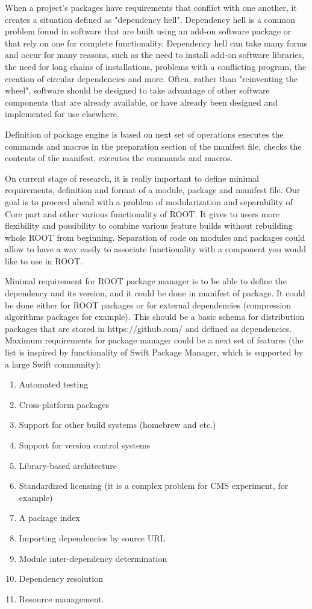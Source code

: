 \documentclass{webofc}
\begin{document}
When a project's packages have requirements that conflict with one another, it creates a situation defined as "dependency hell". Dependency hell is a common problem found in software that are built using an add-on software package or that rely on one for complete functionality. Dependency hell can take many forms and occur for many reasons, such as the need to install add-on software libraries, the need for long chains of installations, problems with a conflicting program, the creation of circular dependencies and more.
Often, rather than "reinventing the wheel", software should be designed to take advantage of other software components that are already available, or have already been designed and implemented for use elsewhere.

Definition of package engine is based on next set of operations executes the commands and macros in the preparation section of the manifest file, checks the contents of the manifest, executes the commands and macros.

On current stage of research, it is really important  to define minimal requirements, definition and format of a module, package and manifest file. Our goal is to proceed ahead with a problem of modularization and separability of Core part and other various functionality of ROOT. It gives to users more flexibility and possibility to combine various feature builds without rebuilding whole ROOT from beginning. Separation of code on modules and packages could allow to have  a way easily to associate functionality with a component you would like to use in ROOT.

Minimal requirement for ROOT package manager is  to be able to define the dependency and its version, and it could be done in manifest of package. It could be done either for ROOT packages or for external dependencies (compression algorithms packages for example). This should be a basic schema for distribution packages that are stored in  https://github.com/ and defined as dependencies.
Maximum requirements for package manager could be a next set of features (the list is inspired by functionality of Swift Package Manager, which is supported by a large Swift community):
\begin{enumerate}
\item Automated testing
\item Cross-platform packages
\item Support for other build systems (homebrew and etc.)
\item Support for version control systems
\item Library-based architecture
\item Standardized licensing (it is a complex problem for CMS experiment, for example)
\item A package index
\item Importing dependencies by source URL
\item Module inter-dependency determination
\item Dependency resolution
\item Resource management.
\end{enumerate}
\end{document}
